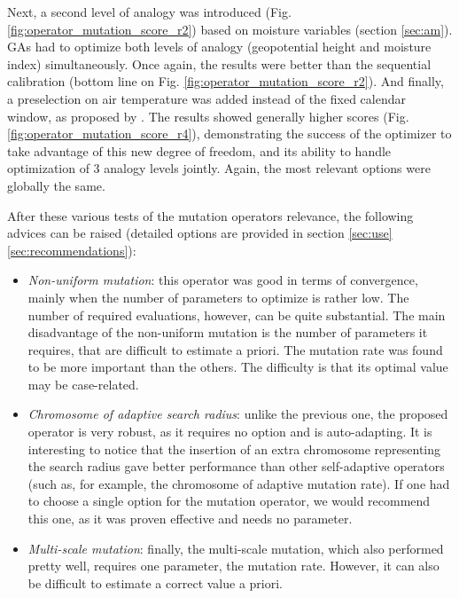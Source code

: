 \documentclass{ametsoc}
\begin{document}
Next, a second level of analogy was introduced (Fig. \ref{fig:operator_mutation_score_r2}) based on moisture variables (section \ref{sec:am}). GAs had to optimize both levels of analogy (geopotential height and moisture index) simultaneously. Once again, the results were better than the sequential calibration (bottom line on Fig. \ref{fig:operator_mutation_score_r2}). And finally, a preselection on air temperature was added instead of the fixed calendar window, as proposed by \cite{BenDaoud2016}. The results showed generally higher scores (Fig. \ref{fig:operator_mutation_score_r4}), demonstrating the success of the optimizer to take advantage of this new degree of freedom, and its ability to handle optimization of 3 analogy levels jointly. Again, the most relevant options were globally the same.

After these various tests of the mutation operators relevance, the following advices can be raised (detailed options are provided in section \ref{sec:use}\ref{sec:recommendations}):

\begin{itemize}
	
	\item \textit{Non-uniform mutation}: this operator was good in terms of convergence, mainly when the number of parameters to optimize is rather low. The number of required evaluations, however, can be quite substantial. The main disadvantage of the non-uniform mutation is the number of parameters it requires, that are difficult to estimate a priori. The mutation rate was found to be more important than the others. The difficulty is that its optimal value may be case-related.
	
	\item \textit{Chromosome of adaptive search radius}: unlike the previous one, the proposed operator is very robust, as it requires no option and is auto-adapting. It is interesting to notice that the insertion of an extra chromosome representing the search radius gave better performance than other self-adaptive operators (such as, for example, the chromosome of adaptive mutation rate). If one had to choose a single option for the mutation operator, we would recommend this one, as it was proven effective and needs no parameter.
	
	\item \textit{Multi-scale mutation}: finally, the multi-scale mutation, which also performed pretty well, requires one parameter, the mutation rate. However, it can also be difficult to estimate a correct value a priori.
	
\end{itemize}
\end{document}
